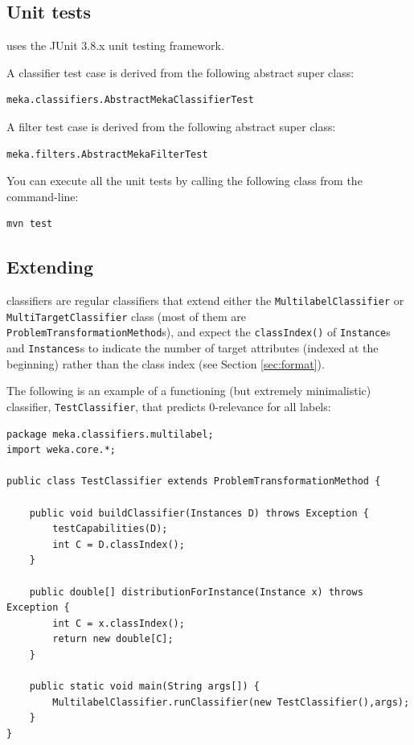 \documentclass[11pt]{article}
\newcommand{\MEKA}{Meka}
\newcommand{\WEKA}{Weka}
\begin{document}
\subsection{Unit tests}
\label{unittests}
\framework{\MEKA} uses the JUnit 3.8.x unit testing framework.

\noindent A classifier test case is derived from the following abstract super class:
\begin{lstlisting}
meka.classifiers.AbstractMekaClassifierTest
\end{lstlisting}

\noindent A filter test case is derived from the following abstract super class:
\begin{lstlisting}
meka.filters.AbstractMekaFilterTest
\end{lstlisting}

\noindent You can execute all the unit tests by calling the following class from the command-line:
\begin{lstlisting}
mvn test
\end{lstlisting}

\subsection{\label{sec:extending}Extending \framework{\MEKA}}%

\framework{\MEKA} classifiers are regular \framework{\WEKA} classifiers that extend either the \texttt{MultilabelClassifier} or \texttt{MultiTargetClassifier} class (most of them are \texttt{ProblemTransformationMethod}s), and expect the \texttt{classIndex()} of \texttt{Instance}s and \texttt{Instances}s to indicate the number of target attributes (indexed at the beginning) rather than the class index (see Section \ref{sec:format}). 

The following is an example of a functioning (but extremely minimalistic) classifier, \texttt{TestClassifier}, that predicts $0$-relevance for all labels:

{\small
\lstset{basicstyle=\small\ttfamily,breaklines=true,language=java,frame=L,xleftmargin=\parindent}
\begin{lstlisting}
package meka.classifiers.multilabel;
import weka.core.*;

public class TestClassifier extends ProblemTransformationMethod {
	
    public void buildClassifier(Instances D) throws Exception {
        testCapabilities(D);
        int C = D.classIndex();
    }
    
    public double[] distributionForInstance(Instance x) throws Exception {
        int C = x.classIndex();
       	return new double[C];
    }
    
    public static void main(String args[]) {
        MultilabelClassifier.runClassifier(new TestClassifier(),args);
    }
}
\end{lstlisting}
}
\end{document}
